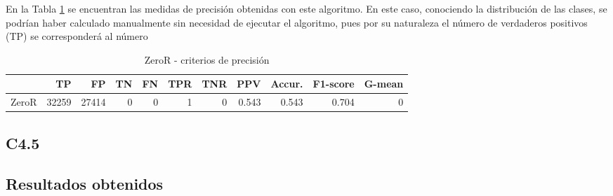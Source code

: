 \documentclass[a4paper, 17pt]{article}
\begin{document}
En la Tabla \ref{tab:zeroR} se encuentran las medidas de precisión obtenidas con este algoritmo. En este caso, conociendo la distribución de las clases, se podrían haber calculado manualmente sin necesidad de ejecutar el algoritmo, pues por su naturaleza el número de verdaderos positivos (TP) se corresponderá al número 

\begin{table}[H]
  \label{tab:zeroR}
  \centering
  \caption{ZeroR - criterios de precisión}
  \begin{tabular}{lrrrrrrrrrr}
    \toprule
    & TP & FP & TN & FN & TPR & TNR & PPV & Accur. & F1-score & G-mean\\ \midrule
    ZeroR & 32259 & 27414 & 0 & 0 & 1 & 0 & 0.543 & 0.543 & 0.704 & 0 \\
    \bottomrule
  \end{tabular}
\end{table}



\subsection{C4.5}



\subsection{Resultados obtenidos}
\end{document}
